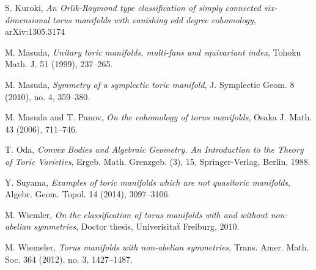 \documentclass[12pt]{amsart}
\theoremstyle{plain} \numberwithin{equation}{section}
\theoremstyle{definition}
\begin{document}
\begin{thebibliography}{99}
S. Kuroki,
\emph{An Orlik-Raymond type classification of simply connected six-dimensional torus manifolds with vanishing odd degree cohomology},
arXiv:1305.3174 


M. Masuda,  
\emph{Unitary toric manifolds, multi-fans and equivariant index}, 
Tohoku Math. J. 51 (1999), 237--265.

M. Masuda, 
\emph{Symmetry of a symplectic toric manifold}, 
J. Symplectic Geom. 8 (2010), no. 4, 359--380.

M. Masuda and T. Panov, 
\emph{On the cohomology of torus manifolds}, Osaka J. Math. 43 (2006), 711--746.%

T. Oda, \emph{Convex Bodies and Algebraic Geometry.
An Introduction to the Theory of Toric Varieties},
Ergeb. Math. Grenzgeb. (3), 15, Springer-Verlag, Berlin, 1988.

Y. Suyama, 
\emph{Examples of toric manifolds which are not quasitoric manifolds},  
Algebr. Geom. Topol. 14 (2014), 3097--3106.


M. Wiemler, 
\emph{On the classification of torus manifolds with and without non-abelian symmetries},
Doctor thesis, Univerisita\"t Freiburg, 2010. 

M. Wiemeler,
\emph{Torus manifolds with non-abelian symmetries},
Trans. Amer. Math. Soc. 364 (2012), no. 3, 1427--1487.

\end{thebibliography}
\end{document}

